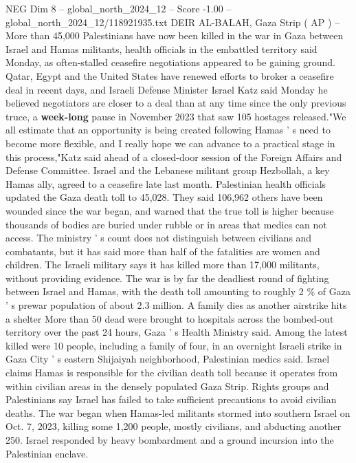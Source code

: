 \begin{textsample}{NEG Dim 8 – global\_north\_2024\_12 – Score -1.00 – global\_north\_2024\_12/118921935.txt}  \label{ex:f8_neg_350}
DEIR AL-BALAH, Gaza Strip ( AP ) -- More than 45,000 Palestinians have now been killed in the war in Gaza between Israel and Hamas militants, health officials in the embattled territory said Monday, as often-stalled ceasefire negotiations appeared to be gaining ground.
Qatar, Egypt and the United States have renewed efforts to broker a ceasefire deal in recent days, and Israeli Defense Minister Israel Katz said Monday he believed negotiators are closer to a deal than at any time since the only previous truce, a \textbf{week-long} pause in November 2023 that saw 105 hostages released."We all estimate that an opportunity is being created following Hamas ' s need to become more flexible, and I really hope we can advance to a practical stage in this process,"Katz said ahead of a closed-door session of the Foreign Affairs and Defense Committee.
Israel and the Lebanese militant group Hezbollah, a key Hamas ally, agreed to a ceasefire late last month.
Palestinian health officials updated the Gaza death toll to 45,028.
They said 106,962 others have been wounded since the war began, and warned that the true toll is higher because thousands of bodies are buried under rubble or in areas that medics can not access.
The ministry ' s count does not distinguish between civilians and combatants, but it has said more than half of the fatalities are women and children.
The Israeli military says it has killed more than 17,000 militants, without providing evidence.
The war is by far the deadliest round of fighting between Israel and Hamas, with the death toll amounting to roughly 2 \% of Gaza ' s prewar population of about 2.3 million.
A family dies as another airstrike hits a shelter More than 50 dead were brought to hospitals across the bombed-out territory over the past 24 hours, Gaza ' s Health Ministry said.
Among the latest killed were 10 people, including a family of four, in an overnight Israeli strike in Gaza City ' s eastern Shijaiyah neighborhood, Palestinian medics said.
Israel claims Hamas is responsible for the civilian death toll because it operates from within civilian areas in the densely populated Gaza Strip.
Rights groups and Palestinians say Israel has failed to take sufficient precautions to avoid civilian deaths.
The war began when Hamas-led militants stormed into southern Israel on Oct. 7, 2023, killing some 1,200 people, mostly civilians, and abducting another 250.
Israel responded by heavy bombardment and a ground incursion into the Palestinian enclave.

\end{textsample}
